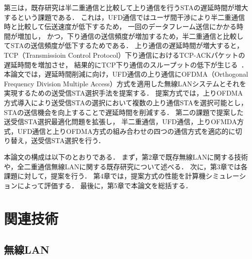 \documentclass[master]{kuisthesis}		%
\begin{document}
\par
第三は，既存研究は半二重通信と比較して上り通信を行うSTAの遅延時間が増大するという課題である．
これは，UFD通信ではユーザ間干渉により半二重通信時と比較して伝送速度が低下するため，
一回のデータフレーム送信にかかる時間が増加し，
かつ，下り通信の送信頻度が増加するため，半二重通信と比較してSTAの送信頻度が低下するためである．
上り通信の遅延時間が増大すると，TCP（Transmissioin Control Protocol）下り通信におけるTCP-ACKパケットの遅延時間を増加させ，
結果的にTCP下り通信のスループットの低下が生じる~\cite{rtt}．
本論文では，遅延時間削減に向け，UFD通信の上り通信にOFDMA（Orthogonal Frequency Division Multiple Access）方式を適用した無線LANシステムとそれを実現するための送受信STA選択手法を提案する．
提案方式では，上りOFDMA方式導入により送受信STAの選択において複数の上り通信STAを選択可能とし，
STAの送信機会を向上することで遅延時間を削減する．
第二の課題で提案した送受信STA選択最適化問題を拡張し，
半二重通信，UFD通信，上りOFMDA方式，UFD通信と上りOFDMA方式の組み合わせの四つの通信方式を適応的に切り替え，送受信STA選択を行う．
\par
本論文の構成は以下のとおりである．
まず，第2章で既存無線LANに関する技術や，全二重通信無線LANに関する既存研究について述べる．
次に，第3章では各課題に対して，提案を行う．
第4章では，提案方式の性能を計算機シミュレーションによって評価する．
最後に，第5章で本論文を総括する．

\section{関連技術}
	\subsection{無線LAN}
\end{document}

